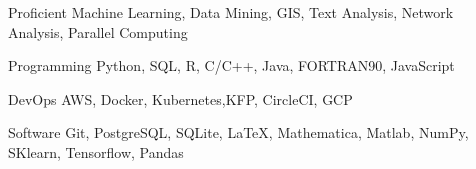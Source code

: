 

\begin{cvskills}

  \cvskill
    {Proficient} %
    {Machine Learning, Data Mining, GIS, Text Analysis, Network Analysis, Parallel Computing} %

  \cvskill
    {Programming} %
    {Python, SQL, R, C/C++, Java, FORTRAN90, JavaScript} %


    \cvskill
     {DevOps} %
     {AWS, Docker, Kubernetes,KFP, CircleCI, GCP} %


  \cvskill
    {Software} %
    {Git, PostgreSQL, SQLite, \LaTeX, Mathematica, Matlab, NumPy, SKlearn, Tensorflow, Pandas} %



\end{cvskills}
